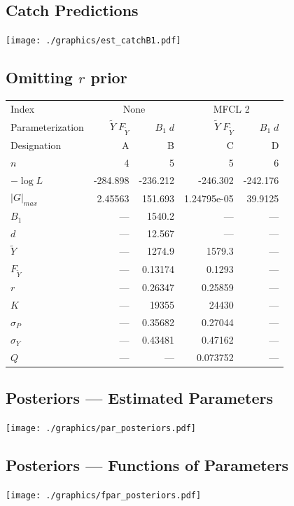 \documentclass[letterpaper,KOMA,landscape,titlepage]{powersem}
\newcommand\MSY{\widetilde{Y}}
\newcommand\Fmsy{F_{\MSY}}
\newcommand\MSYFmsy{\MSY\;\Fmsy}
\newcommand\Bd{B_1\; d}
\begin{document}
\begin{slide}\section{Catch Predictions}
\begin{center}
\texttt{[image: ./graphics/est\_catchB1.pdf]}
\end{center}
\end{slide}

\begin{slide}\section{Omitting $r$ prior}
\label{tag:ests4NOprior}
{\scriptsize
\begin{center}
\begin{tabular}{|l|rr|rr|}
\hline
Index & \multicolumn{2}{c|}{None}&\multicolumn{2}{c|}{MFCL 2}\\
\cline{2-3}\cline{4-5}
Parameterization&$\MSYFmsy$&$\Bd$&$\MSYFmsy$&$\Bd$\\
Designation& A & B& C& D\\
\hline
\hline
$n$ & 4 & 5 & 5 & 6\\
$-\log L$ & -284.898 & -236.212 & -246.302 & -242.176\\
$|G|_{max}$ & 2.45563 & 151.693 & 1.24795e-05 & 39.9125\\
\hline
$B_1$ & --- & 1540.2 & --- & ---\\
$d$ & --- & 12.567 & --- & ---\\
$\MSY$ & --- & 1274.9 & 1579.3 & ---\\
$\Fmsy$ & --- & 0.13174 & 0.1293 & ---\\
$r$ & --- & 0.26347 & 0.25859 & ---\\
$K$ & --- & 19355 & 24430 & ---\\
$\sigma_P$ & --- & 0.35682 & 0.27044 & ---\\
$\sigma_Y$ & --- & 0.43481 & 0.47162 & ---\\
$Q$ & --- & --- & 0.073752 & ---\\
\hline
\end{tabular}
\end{center} }
\end{slide}

\begin{slide}\section{Posteriors --- Estimated Parameters}
\begin{center}
\texttt{[image: ./graphics/par\_posteriors.pdf]}
\end{center}
\end{slide}

\begin{slide}\section{Posteriors --- Functions of Parameters}
\begin{center}
\texttt{[image: ./graphics/fpar\_posteriors.pdf]}
\end{center}
\end{slide}
\end{document}
